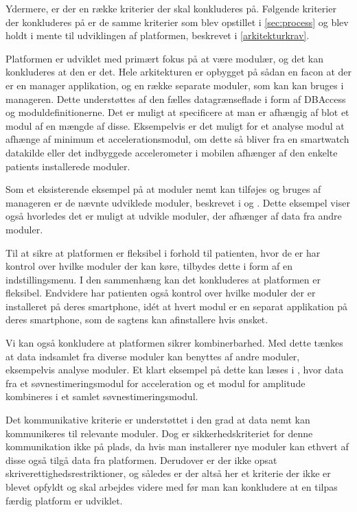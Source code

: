 Ydermere, er der en række kriterier der skal konkluderes på.
Følgende kriterier der konkluderes på er de samme kriterier som blev opstillet i \cref{sec:process} og blev holdt i mente til udviklingen af platformen, beskrevet i \cref{arkitekturkrav}.
\begin{description}[style=nextline]
	\item[Modulær]
	Platformen er udviklet med primært fokus på at være modulær, og det kan konkluderes at den er det.
	Hele arkitekturen er opbygget på sådan en facon at der er en manager applikation, og en række separate moduler, som kan kan bruges i manageren.
	Dette understøttes af den fælles datagrænseflade i form af DBAccess og moduldefinitionerne.  
	Det er muligt at specificere at man er afhængig af blot et modul af en mængde af disse.
	Eksempelvis er det muligt for et analyse modul at afhænge af minimum et accelerationsmodul, om dette så bliver fra en smartwatch datakilde eller det indbyggede accelerometer i mobilen afhænger af den enkelte patients installerede moduler.
	
	Som et eksisterende eksempel på at moduler nemt kan tilføjes og bruges af manageren er de nævnte udviklede moduler, beskrevet i \citet{misc:soevnrapp} og \citet{misc:surveyrapp}.
	Dette eksempel viser også hvorledes det er muligt at udvikle moduler, der afhænger af data fra andre moduler.
	
	\item[Fleksibilitet]
	Til at sikre at platformen er fleksibel i forhold til patienten, hvor de er har kontrol over hvilke moduler der kan køre, tilbydes dette i form af en indstillingsmenu.
	I den sammenhæng kan det konkluderes at platformen er fleksibel.
	Endvidere har patienten også kontrol over hvilke moduler der er installeret på deres smartphone, idét at hvert modul er en separat applikation på deres smartphone, som de sagtens kan afinstallere hvis ønsket.
	
	\item[Kombinerbar]
	Vi kan også konkludere at platformen sikrer kombinerbarhed.
	Med dette tænkes at data indsamlet fra diverse moduler kan benyttes af andre moduler, eksempelvis analyse moduler.
	Et klart eksempel på dette kan læses i \citet{misc:soevnrapp}, hvor data fra et søvnestimeringsmodul for acceleration og et modul for amplitude kombineres i et samlet søvnestimeringsmodul.
	
	\item[Kommunikativ]
	Det kommunikative kriterie er understøttet i den grad at data nemt kan kommunikeres til relevante moduler.
	Dog er sikkerhedskriteriet for denne kommunikation ikke på plads, da hvis man installerer nye moduler kan ethvert af disse også tilgå data fra platformen.
	Derudover er der ikke opsat skriverettighedsrestriktioner, og således er der altså her et kriterie der ikke er blevet opfyldt og skal arbejdes videre med før man kan konkludere at en tilpas færdig platform er udviklet.
\end{description}


